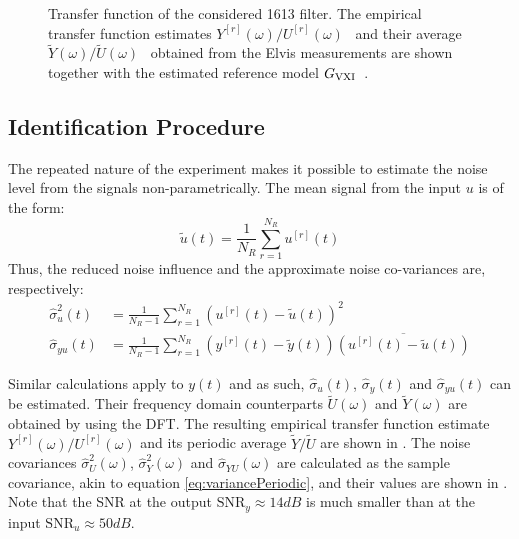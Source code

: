 \begin{figure}
  \centering
  \setlength{\figurewidth}{0.75\columnwidth}
  \setlength{\figureheight}{0.68\figurewidth}
  
  \caption[\BK{} 1613 filter transfer function]{Transfer function of the considered \BK{} 1613 filter.
  The empirical transfer function estimates $Y^{[r]}(\omega)/U^{[r]}(\omega)$~ and their average $\tilde{Y}(\omega)/\tilde{U}(\omega)$~ obtained from the Elvis measurements are shown together with the estimated reference model $G_{\mathrm{VXI}}$~.} 
  \label{fig:bk1613}
\end{figure}


\subsection{Identification Procedure}
The repeated nature of the experiment makes it possible to estimate the noise level from the signals non-parametrically.
The mean signal from the input $u$ is of the form:
\begin{equation}
  \tilde{u}(t) = \frac{1}{N_R} \sum_{r=1}^{N_R} u^{[r]}(t)
\end{equation}
Thus, the reduced noise influence and the approximate noise co-variances are, respectively:
\begin{align}
  \hat\sigma_{u}^2(t) &= \frac{1}{N_R - 1} 
                    \sum_{r=1}^{N_R} 
                    \left( u^{[r]}(t) - \tilde{u}(t) \right)^2 \\
  \hat\sigma_{yu}(t) &= \frac{1}{N_R - 1} 
                    \sum_{r=1}^{N_R} 
                    \left( y^{[r]}(t) - \tilde{y}(t) \right)
                    \overline{\left( u^{[r]}(t) - \tilde{u}(t) \right)}
  \label{eq:variancePeriodic}            
\end{align}
 
Similar calculations apply to $y(t)$ and as such, $\hat\sigma_u(t)$, $\hat\sigma_y(t)$ and $\hat\sigma_{yu}(t)$ can be estimated.
Their frequency domain counterparts $\tilde{U}(\omega)$ and $\tilde{Y}(\omega)$ are obtained by using the DFT.
The resulting empirical transfer function estimate $Y^{[r]}(\omega)/U^{[r]}(\omega)$ and its periodic average $\tilde{Y}/\tilde{U}$ are shown in .
The noise covariances $\hat\sigma^2_{U}(\omega)$, $\hat\sigma^2_{Y}(\omega)$ and  $\hat\sigma_{YU}(\omega)$ are calculated as the sample covariance, akin to equation \eqref{eq:variancePeriodic}, and their values are shown in .
Note that the SNR at the output $\mathrm{SNR}_{y} \approx 14 \unit{dB}$ is much smaller than at the input $\mathrm{SNR}_{u} \approx 50 \unit{dB}$.

